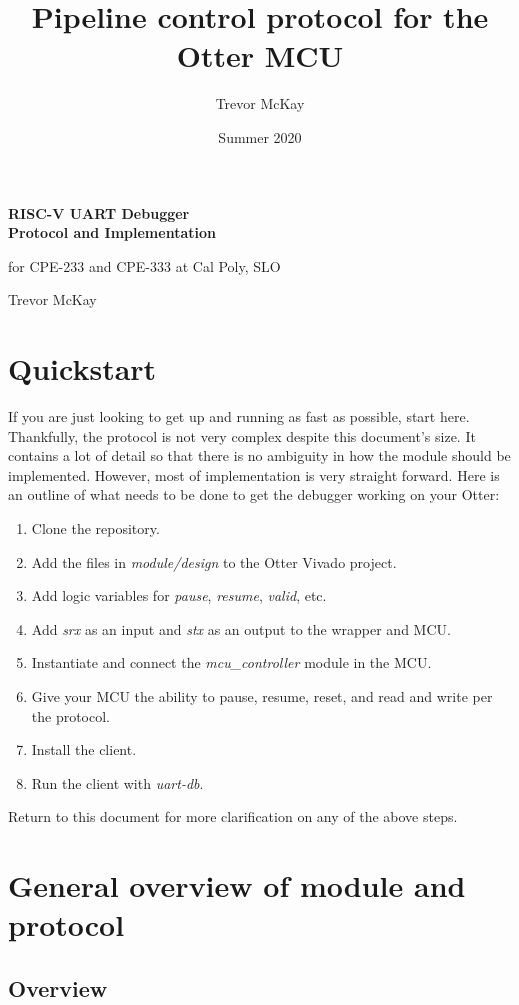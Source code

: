 \documentclass[10pt,a4paper]{article}
\title{Pipeline control protocol for the Otter MCU}
\author{Trevor McKay}
\date{Summer 2020}
\begin{document}
\begin{center}
    \Large\textbf{RISC-V UART Debugger\\Protocol and Implementation}

    \medskip
    \small{for CPE-233 and CPE-333 at Cal Poly, SLO}

    \bigskip
    \tiny{Trevor McKay}
\end{center}

\tableofcontents

\newpage
\section{Quickstart}
If you are just looking to get up and running as fast as possible, start here. Thankfully, the
protocol is not very complex despite this document's size. It contains a lot of detail so that there
is no ambiguity in how the module should be implemented. However, most of implementation is very
straight forward. Here is an outline of what needs to be done to get the debugger working on your Otter:

\begin{enumerate}
    \item Clone the repository.
    \item Add the files in \emph{module/design} to the Otter Vivado project.
    \item Add logic variables for \emph{pause}, \emph{resume}, \emph{valid}, etc.
    \item Add \emph{srx} as an input and \emph{stx} as an output to the wrapper and MCU.
    \item Instantiate and connect the \emph{mcu\_controller} module in the MCU.
    \item Give your MCU the ability to pause, resume, reset, and read and write per the protocol.
    \item Install the client.
    \item Run the client with \emph{uart-db}.
\end{enumerate}

\noindent Return to this document for more clarification on any of the above steps.

\section{General overview of module and protocol}

\subsection{Overview}
\end{document}
